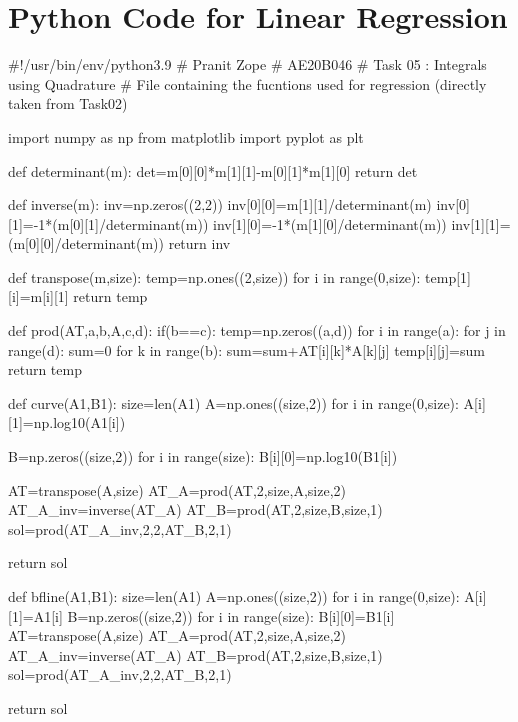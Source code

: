 \documentclass[12pt]{article}
\begin{document}
\section{Python Code for Linear Regression}
\begin{python}
#!/usr/bin/env/python3.9
# Pranit Zope
# AE20B046
# Task 05 : Integrals using Quadrature
# File containing the fucntions used for regression (directly taken from Task02)

import numpy as np
from matplotlib import pyplot as plt



def determinant(m):
    det=m[0][0]*m[1][1]-m[0][1]*m[1][0]
    return det

def inverse(m):
    inv=np.zeros((2,2))
    inv[0][0]=m[1][1]/determinant(m)
    inv[0][1]=-1*(m[0][1]/determinant(m))
    inv[1][0]=-1*(m[1][0]/determinant(m))
    inv[1][1]=(m[0][0]/determinant(m))
    return inv

def transpose(m,size):
    temp=np.ones((2,size))
    for i in range(0,size):
        temp[1][i]=m[i][1]
    return temp


def prod(AT,a,b,A,c,d):
    if(b==c):
        temp=np.zeros((a,d))
        for i in range(a):
            for j in range(d):
                sum=0
                for k in range(b):
                    sum=sum+AT[i][k]*A[k][j]
                temp[i][j]=sum
        return temp

def curve(A1,B1):             
    size=len(A1)
    A=np.ones((size,2))
    for i in range(0,size):
        A[i][1]=np.log10(A1[i])
    
    B=np.zeros((size,2))
    for i in range(size):
        B[i][0]=np.log10(B1[i])
    

    AT=transpose(A,size)
    AT_A=prod(AT,2,size,A,size,2)
    AT_A_inv=inverse(AT_A)
    AT_B=prod(AT,2,size,B,size,1)
    sol=prod(AT_A_inv,2,2,AT_B,2,1)
   
    return sol


def bfline(A1,B1):
    size=len(A1)
    A=np.ones((size,2))
    for i in range(0,size):
        A[i][1]=A1[i]
    B=np.zeros((size,2))
    for i in range(size):
        B[i][0]=B1[i]
    AT=transpose(A,size)
    AT_A=prod(AT,2,size,A,size,2)
    AT_A_inv=inverse(AT_A)
    AT_B=prod(AT,2,size,B,size,1)
    sol=prod(AT_A_inv,2,2,AT_B,2,1)

    return sol
\end{python}
\end{document}

